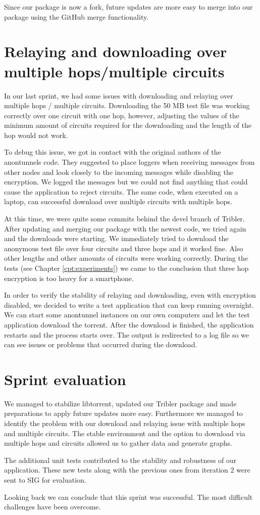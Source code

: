 		Since our package is now a fork, future updates are more easy to merge into our package using the GitHub merge functionality.
			
	\section{Relaying and downloading over multiple hops/multiple circuits}
		In our last sprint, we had some issues with downloading and relaying over multiple hops / multiple circuits. Downloading the 50 MB test file was working correctly over one circuit with one hop, however, adjusting the values of the minimum amount of circuits required for the downloading and the length of the hop would not work.
		
		To debug this issue, we got in contact with the original authors of the anontunnels code. They suggested to place loggers when receiving messages from other nodes and look closely to the incoming messages while disabling the encryption. We logged the messages but we could not find anything that could cause the application to reject circuits. The same code, when executed on a laptop, can successful download over multiple circuits with multiple hops.
		
		At this time, we were quite some commits behind the devel branch of Tribler. After updating and merging our package with the newest code, we tried again and the downloads were starting. We immediately tried to download the anonymous test file over four circuits and three hops and it worked fine. Also other lengths and other amounts of circuits were working correctly. During the tests (see Chapter \ref{cpt:experiments}) we came to the conclusion that three hop encryption is too heavy for a smartphone.
		
		In order to verify the stability of relaying and downloading, even with encryption disabled, we decided to write a test application that can keep running overnight. We can start some anontunnel instances on our own computers and let the test application download the torrent. After the download is finished, the application restarts and the process starts over. The output is redirected to a log file so we can see issues or problems that occurred during the download.
			
	\section{Sprint evaluation}
		We managed to stabilize libtorrent, updated our Tribler package and made preparations to apply future updates more easy. Furthermore we managed to identify the problem with our download and relaying issue with multiple hops and multiple circuits. The stable environment and the option to download via multiple hops and circuits allowed us to gather data and generate graphs.
		
		The additional unit tests contributed to the stability and robustness of our application. These new tests along with the previous ones from iteration 2 were sent to SIG for evaluation.
		
		Looking back we can conclude that this sprint was successful. The most difficult challenges have been overcome.
